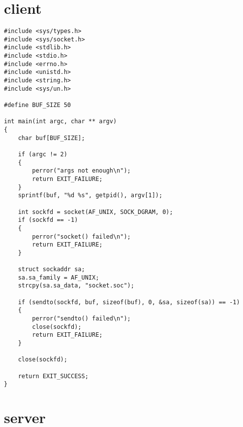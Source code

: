 \section*{client}

\begin{lstlisting}
#include <sys/types.h>
#include <sys/socket.h>
#include <stdlib.h>
#include <stdio.h>
#include <errno.h>
#include <unistd.h>
#include <string.h>
#include <sys/un.h>

#define BUF_SIZE 50

int main(int argc, char ** argv)
{
    char buf[BUF_SIZE];

    if (argc != 2)
    {
        perror("args not enough\n");
        return EXIT_FAILURE;
    }
    sprintf(buf, "%d %s", getpid(), argv[1]);

    int sockfd = socket(AF_UNIX, SOCK_DGRAM, 0);
    if (sockfd == -1)
    {
        perror("socket() failed\n");
        return EXIT_FAILURE;
    }

    struct sockaddr sa;
    sa.sa_family = AF_UNIX;
    strcpy(sa.sa_data, "socket.soc");

    if (sendto(sockfd, buf, sizeof(buf), 0, &sa, sizeof(sa)) == -1)
    {
        perror("sendto() failed\n");
        close(sockfd);
        return EXIT_FAILURE;
    }

    close(sockfd);

    return EXIT_SUCCESS;
}
\end{lstlisting}

\section*{server}

